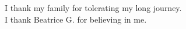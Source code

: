 \chapter*{}
\thispagestyle{empty}
\vspace*{3cm}

\begin{center}
\hfill I thank my family for tolerating my long journey. \\
\hfill I thank Beatrice G. for believing in me. \\
\end{center}